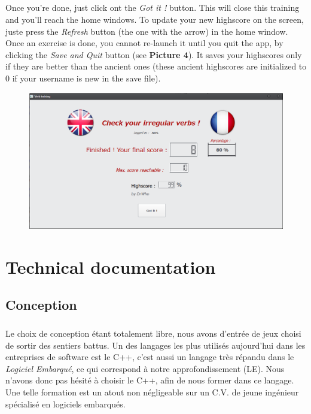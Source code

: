 \documentclass[12pt, a4paper]{report}
\begin{document}
\paragraph{}Once you're done, just click ont the \textit{Got it !} button. This will close this training and you'll reach the home windows. To update your new highscore on the screen, juste press the \textit{Refresh} button (the one with the arrow) in the home window. Once an exercise is done, you cannot re-launch it until you quit the app, by clicking the \textit{Save and Quit} button (see \textbf{Picture 4}). It saves your highscores only if they are better than the ancient ones (these ancient highscores are initialized to 0 if your username is new in the save file).

\begin{figure}[H]
    \centering
    \includegraphics[scale=0.55]{images/high.png}
\end{figure}

\newpage
\chapter*{Technical documentation}

\section*{\hspace{0.6cm}Conception}

\paragraph{}Le choix de conception étant totalement libre, nous avons d'entrée de jeux choisi de sortir des sentiers battus. Un des langages les plus utilisés aujourd'hui dans les entreprises de software est le C++, c'est aussi un langage très répandu dans le \textit{Logiciel Embarqué}, ce qui correspond à notre approfondissement (LE). Nous n'avons donc pas hésité à choisir le C++, afin de nous former dans ce langage. Une telle formation est un atout non négligeable sur un C.V. de jeune ingénieur spécialisé en logiciels embarqués.
\end{document}

